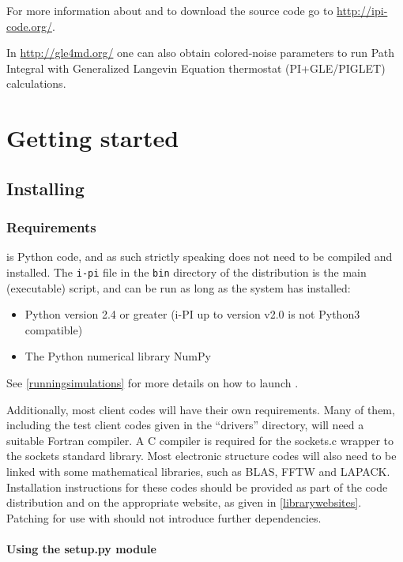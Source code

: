 \documentclass[11pt,english,fleqn]{report}
\begin{document}
For more information about \ipi{} and to download the source code
go to \url{http://ipi-code.org/}.

In \url{http://gle4md.org/} one can also obtain colored-noise
parameters to run Path Integral with Generalized Langevin Equation
thermostat (PI+GLE/PIGLET) calculations.


\chapter{Getting started}

\label{getstarted}


\section{Installing \ipi}

\label{install}


\subsection{Requirements}

\ipi is Python code, and as such strictly speaking does not
need to be compiled and installed. The {\tt i-pi} file in the
{\tt bin} directory of the distribution is the main (executable) script,
and can be run as long as the system has installed:
\begin{itemize}
\item Python version 2.4 or greater (i-PI up to version v2.0 is not Python3 compatible)
\item The Python numerical library NumPy
\end{itemize}
See \ref{runningsimulations} for more details on how to launch
\ipi.

Additionally, most client codes will have their own requirements.
Many of them, including the test client codes given in the {}``drivers''
directory, will need a suitable Fortran compiler. A C compiler is
required for the sockets.c wrapper to the sockets standard library.
Most electronic structure codes will also need to be linked with some
mathematical libraries, such as BLAS, FFTW and LAPACK. Installation
instructions for these codes should be provided as part of the code
distribution and on the appropriate website, as given in \ref{librarywebsites}.
Patching for use with \ipi{} should not introduce further dependencies.

\subsubsection{Using the setup.py module}
\end{document}
